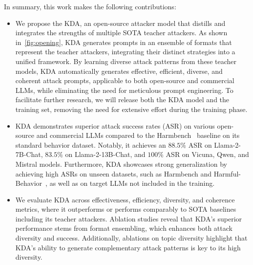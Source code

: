 In summary, this work makes the following contributions:
%
\begin{itemize}[wide]
    \item We propose the KDA, an open-source attacker model that distills and integrates the strengths of multiple SOTA teacher attackers. As shown in~\autoref{fig:opening}, 
    KDA generates prompts in an ensemble of formats that represent the teacher attackers, integrating their distinct strategies into a unified framework. By learning diverse attack patterns from these teacher models, KDA automatically generates effective, efficient, diverse, and coherent attack prompts, applicable to both open-source and commercial LLMs, while eliminating the need for meticulous prompt engineering. To facilitate further research, we will release both the KDA model and the training set, removing the need for extensive effort during the training phase.


    \item KDA demonstrates superior attack success rates (ASR) on various open-source and commercial LLMs compared to the Harmbench~\citep{mazeika_harmbench_2024} baseline on its standard behavior dataset. Notably, it achieves an $88.5\%$ ASR on Llama-2-7B-Chat, $83.5\%$ on Llama-2-13B-Chat, and $100\%$ ASR on Vicuna, Qwen, and Mistral models. Furthermore, KDA showcases strong generalization by achieving high ASRs on unseen datasets, such as Harmbench and Harmful-Behavior~\citep{chao_jailbreaking_2024}, as well as on target LLMs not included in the training.

    \item We evaluate KDA across effectiveness, efficiency, diversity, and coherence metrics, where it outperforms or performs comparably to SOTA baselines including its teacher attackers.  Ablation studies reveal that KDA's superior performance stems from format ensembling, which enhances both attack diversity and success. Additionally, ablations on topic diversity highlight that KDA's ability to generate complementary attack patterns is key to its high diversity.




    


\end{itemize}




